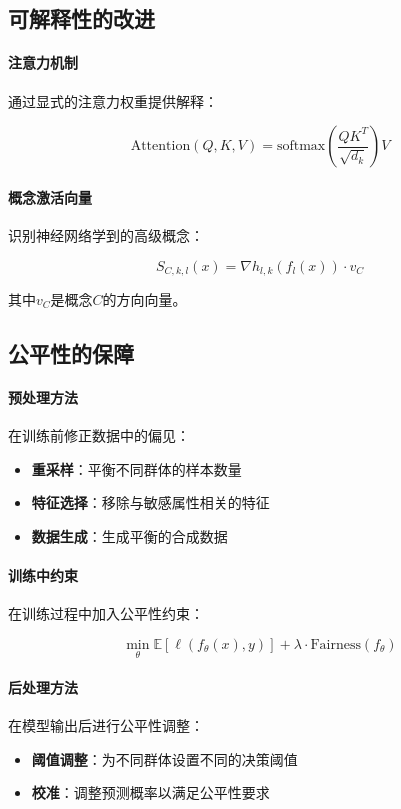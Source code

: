 \subsection{可解释性的改进}

\paragraph{注意力机制}
通过显式的注意力权重提供解释：

$$\text{Attention}(Q, K, V) = \text{softmax}\left(\frac{QK^T}{\sqrt{d_k}}\right)V$$

\paragraph{概念激活向量}
识别神经网络学到的高级概念：

$$S_{C,k,l}(x) = \nabla h_{l,k}(f_l(x)) \cdot v_C$$

其中$v_C$是概念$C$的方向向量。

\subsection{公平性的保障}

\paragraph{预处理方法}
在训练前修正数据中的偏见：

\begin{itemize}
\item \textbf{重采样}：平衡不同群体的样本数量
\item \textbf{特征选择}：移除与敏感属性相关的特征
\item \textbf{数据生成}：生成平衡的合成数据
\end{itemize}

\paragraph{训练中约束}
在训练过程中加入公平性约束：

$$\min_\theta \mathbb{E}[\ell(f_\theta(x), y)] + \lambda \cdot \text{Fairness}(f_\theta)$$

\paragraph{后处理方法}
在模型输出后进行公平性调整：

\begin{itemize}
\item \textbf{阈值调整}：为不同群体设置不同的决策阈值
\item \textbf{校准}：调整预测概率以满足公平性要求
\end{itemize}

